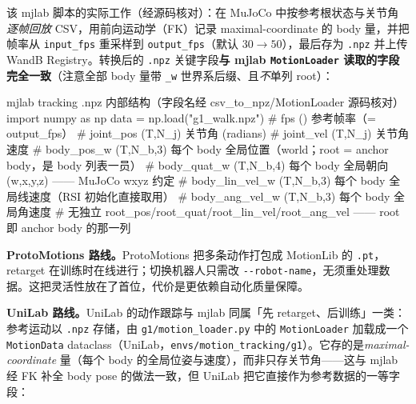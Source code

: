 该 mjlab 脚本的实际工作（经源码核对）：在 MuJoCo 中按参考根状态与关节角\emph{逐帧回放} CSV，用前向运动学（FK）记录 maximal-coordinate 的 body 量，并把帧率从 \texttt{input\_fps} 重采样到 \texttt{output\_fps}（默认 $30\to50$），最后存为 \texttt{.npz} 并上传 WandB Registry。转换后的 \texttt{.npz} 关键字段\textbf{与 mjlab \texttt{MotionLoader} 读取的字段完全一致}（注意全部 body 量带 \texttt{\_w} 世界系后缀、且\emph{不}单列 root）：

\begin{codebox}[Python]{mjlab tracking .npz 内部结构（字段名经 csv\_to\_npz/MotionLoader 源码核对）}
import numpy as np
data = np.load("g1_walk.npz")
# fps            ()         参考帧率（= output_fps）
# joint_pos      (T,N_j)    关节角 (radians)
# joint_vel      (T,N_j)    关节角速度
# body_pos_w     (T,N_b,3)  每个 body 全局位置（world；root = anchor body，是 body 列表一员）
# body_quat_w    (T,N_b,4)  每个 body 全局朝向 (w,x,y,z) —— MuJoCo wxyz 约定
# body_lin_vel_w (T,N_b,3)  每个 body 全局线速度（RSI 初始化直接取用）
# body_ang_vel_w (T,N_b,3)  每个 body 全局角速度
# 无独立 root_pos/root_quat/root_lin_vel/root_ang_vel —— root 即 anchor body 的那一列
\end{codebox}

\textbf{ProtoMotions 路线。}ProtoMotions 把多条动作打包成 MotionLib 的 \texttt{.pt}，retarget 在训练时在线进行；切换机器人只需改 \verb|--robot-name|，无须重处理数据。这把灵活性放在了首位，代价是更依赖自动化质量保障。

\textbf{UniLab 路线。}UniLab 的动作跟踪与 mjlab 同属「先 retarget、后训练」一类：参考运动以 \texttt{.npz} 存储，由 \verb|g1/motion_loader.py| 中的 \verb|MotionLoader| 加载成一个 \verb|MotionData| dataclass（UniLab，\texttt{envs/motion\_tracking/g1}）。它存的是\emph{maximal-coordinate} 量（每个 body 的全局位姿与速度），而非只存关节角——这与 mjlab 经 FK 补全 body pose 的做法一致，但 UniLab 把它直接作为参考数据的一等字段：

